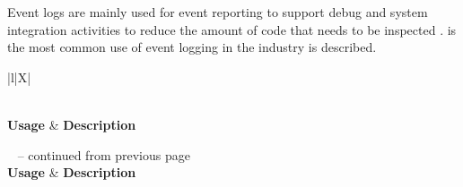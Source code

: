 Event logs are mainly used for event reporting to support debug and system integration activities to reduce the amount of code that needs to be inspected \cite{Baccanico2014}.  is the most common use of event logging in the industry is described.

\begin{xltabular}{\textwidth}{|l|X|}
	\caption[Event logs usage]
	{\textit{Event logs usage}}
	\label{tbl:ch1_eventLogsUsage} \\
    
	\hline
	\textbf{Usage} & \textbf{Description} \\
	\hline
	\endfirsthead

	{\tablename\ \thetable{} -- continued from previous page} \\
	\hline
	\textbf{Usage} & \textbf{Description} \\
	\endhead

	 \\ \hline
	\endfoot

	\hline
	\endlastfoot


\end{xltabular}
